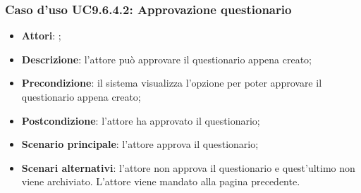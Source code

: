 			\subsubsection{Caso d'uso UC9.6.4.2: Approvazione questionario}
			\label{UC9.6.4.2}
			\begin{itemize}
				\item \textbf{Attori}: \uaupro{};
				\item \textbf{Descrizione}: l'attore può approvare il questionario appena creato;
				\item \textbf{Precondizione}: il sistema visualizza l'opzione per poter approvare il questionario appena creato;
				\item \textbf{Postcondizione}: l'attore ha approvato il questionario;
				\item \textbf{Scenario principale}: l'attore approva il questionario;
				\item \textbf{Scenari alternativi}: l'attore non approva il questionario e quest'ultimo non viene archiviato. L'attore viene mandato alla pagina precedente.
			\end{itemize}				
	 
